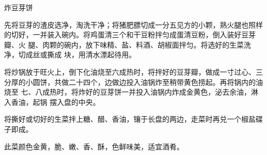 %
%
%
%
%
%
%
\begin{recipe}{炸豆芽饼}

\ingredients


\preparation

\step 先将豆芽的渣皮选净，淘洗干净；将猪肥膘切成一分五见方的小颗，熟火腿也照样
的切好，一并装入碗内。将鸡蛋清三个和干豆粉拌匀成蛋清豆粉，倒入装好豆芽瓣、火
腿、肉颗的碗内，放下味精、盐、料酒、胡椒面拌匀。将选好的生菜洗净，切成丝或撕成
块，用清水漂起待用。

\step 将炒锅放于旺火上，倒下化油烧至六成热时，将拌好的豆芽瓣，做成一寸过心、三
分厚的小圆饼，共做二十四个，边做边投入油锅炸至稍带黄色捞起。再将锅内的油烧至
七、八成热时，将炸好的豆芽饼一并投入油锅内炸成金黄色，泌去余油，淋入香油，起锅
摆入盘的中央。

\step 将撕好或切好的生菜拌上糖、醋、香油，镶于长盘的两边，走菜时再兑一个椒盐碟
子即成。

\features

此菜颜色金黄，脆、嫩、香、酥，色鲜味美，适宜酒肴。

\end{recipe}

